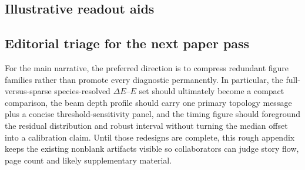 \subsection{Illustrative readout aids}



\subsection{Editorial triage for the next paper pass}

For the main narrative, the preferred direction is to compress redundant figure families rather than promote every diagnostic permanently. In particular, the full-versus-sparse species-resolved $\Delta E$--$E$ set should ultimately become a compact comparison, the beam depth profile should carry one primary topology message plus a concise threshold-sensitivity panel, and the timing figure should foreground the residual distribution and robust interval without turning the median offset into a calibration claim. Until those redesigns are complete, this rough appendix keeps the existing nonblank artifacts visible so collaborators can judge story flow, page count and likely supplementary material.
